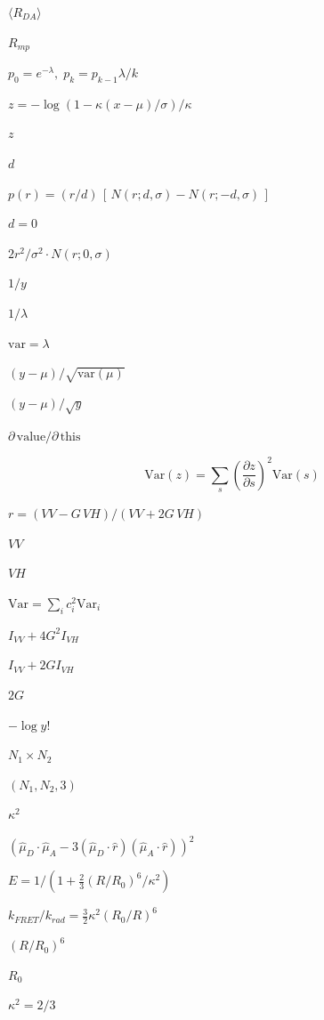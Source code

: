 \documentclass{article}
\begin{document}
$\langle R_{DA}\rangle$
\pagebreak

$R_{mp}$
\pagebreak

$p_0 = e^{-\lambda},\; p_k = p_{k-1}\lambda/k$
\pagebreak

$z = -\log(1 - \kappa (x - \mu)/\sigma)/\kappa$
\pagebreak

$z$
\pagebreak

$d$
\pagebreak

$p(r) = (r/d)\,[\,N(r; d, \sigma) - N(r; -d, \sigma)\,]$
\pagebreak

$d = 0$
\pagebreak

$2 r^2/\sigma^2 \cdot N(r; 0, \sigma)$
\pagebreak

$1/y$
\pagebreak

$1/\lambda$
\pagebreak

$\mathrm{var} = \lambda$
\pagebreak

$(y-\mu)/\sqrt{\mathrm{var}(\mu)}$
\pagebreak

$(y-\mu)/\sqrt{y}$
\pagebreak

$\partial\,\mathrm{value}/\partial\,\mathrm{this}$
\pagebreak

\[ \mathrm{Var}(z) = \sum_s \left(\frac{\partial z}{\partial s}\right)^2
    \mathrm{Var}(s) \]
\pagebreak

$r = (VV - G\,VH)/(VV + 2G\,VH)$
\pagebreak

$VV$
\pagebreak

$VH$
\pagebreak

$\mathrm{Var} = \sum_i c_i^2
\mathrm{Var}_i$
\pagebreak

$I_{VV} + 4G^2 I_{VH}$
\pagebreak

$I_{VV} + 2G I_{VH}$
\pagebreak

$2G$
\pagebreak

$-\log y!$
\pagebreak

$N_1 \times N_2$
\pagebreak

$(N_1, N_2, 3)$
\pagebreak

$\kappa^2$
\pagebreak

$(\hat\mu_D\cdot\hat\mu_A - 3(\hat\mu_D\cdot\hat r)(\hat\mu_A\cdot\hat r))^2$
\pagebreak

$E = 1/(1 + \tfrac{2}{3}(R/R_0)^6/\kappa^2)$
\pagebreak

$k_{FRET}/k_{rad} = \tfrac{3}{2}\kappa^2 (R_0/R)^6$
\pagebreak

$(R/R_0)^6$
\pagebreak

$R_0$
\pagebreak

$\kappa^2 = 2/3$
\pagebreak
\end{document}
